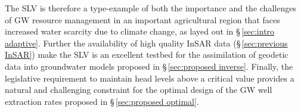 \documentclass[11pt,final]{article}%
\renewcommand{\citep}{\cite}
\begin{document}
The SLV is therefore a type-example of both the importance and the challenges of GW resource management in an important agricultural region that faces increased water scarcity due to climate change, as layed out in \S\,\ref{sec:intro adaptive}. Further the availability of high quality InSAR data (\S\,\ref{sec:previous InSAR}) make the SLV is an excellent testbed for the assimilation of geodetic data into groundwater models proposed in \S\,\ref{sec:proposed inverse}.  Finally, the legislative requirement to maintain head levels above a critical value provides a natural and challenging constraint for the optimal design of the GW well extraction rates proposed in \S\,\ref{sec:proposed optimal}.





\end{document}
